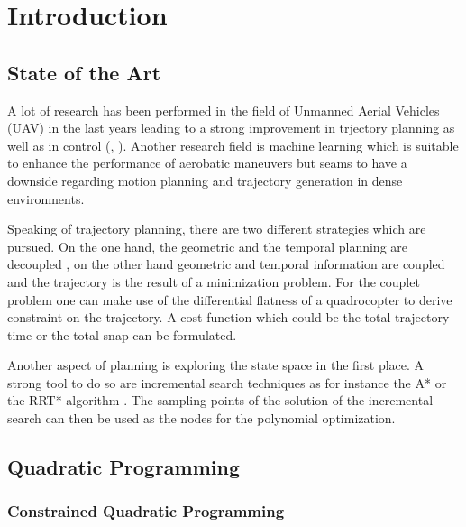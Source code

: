 
\chapter{Introduction}\label{sec:introduction}

\section{State of the Art}\label{sec:state}

A lot of research has been performed in the field of Unmanned Aerial Vehicles (UAV) in the last years leading to a strong improvement in trjectory planning \cite{he} as well as in control (\cite{colling}, \cite{hehn}).  Another research field is machine learning \cite{lup} which is suitable to enhance the performance of aerobatic maneuvers but seams to have a downside regarding motion planning and trajectory generation in dense environments. \newline

Speaking of trajectory planning, there are two different strategies which are pursued. On the one hand, the geometric and the temporal planning are decoupled  \cite{bou}, on the other hand geometric and temporal information are coupled and the trajectory is the result of a minimization problem. For the couplet problem one can make use of the differential flatness of a quadrocopter to derive constraint on the trajectory. A cost function which could be the total trajectory-time \cite{hehn} or the total snap \cite{mellinger} can be formulated. \newline



Another aspect of planning is exploring the state space in the first place. A strong tool to do so are incremental search techniques as for instance the A* \cite{lik} or the RRT* algorithm \cite{richter}. The sampling points of the solution of the incremental search can then be used as the nodes for the polynomial optimization.

\section{Quadratic Programming}\label{sec:quadratic}

\subsection{Constrained Quadratic Programming}

